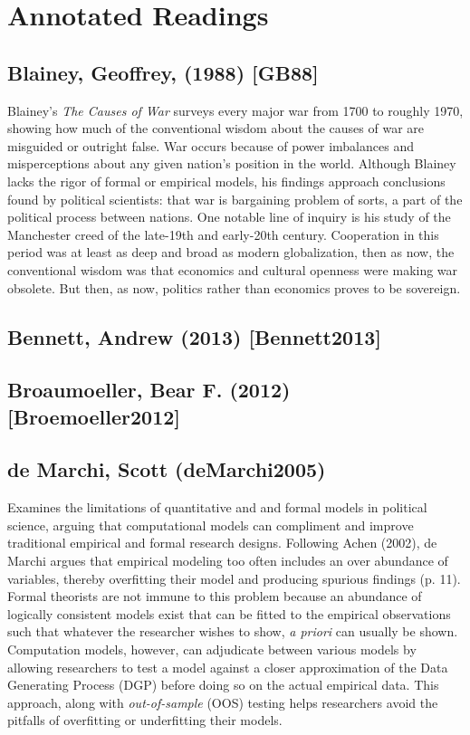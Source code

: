 \documentclass[11pt]{article}
\begin{document}
\section{Annotated Readings}
\label{sec-6}
\subsection{Blainey, Geoffrey, (1988) [GB88]}
\label{sec-6-1}
Blainey's \emph{The Causes of War} surveys every major war from 1700 to
roughly 1970, showing how much of the conventional wisdom about the
causes of war are misguided or outright false. War occurs because of
power imbalances and misperceptions about any given nation's position
in the world. Although Blainey lacks the rigor of formal or empirical
models, his findings approach conclusions found by political
scientists: that war is bargaining problem of sorts, a part of the
political process between nations. One notable line of inquiry is his
study of the Manchester creed of the late-19th and early-20th
century. Cooperation in this period was at least as deep and broad as
modern globalization, then as now, the conventional wisdom was that
economics and cultural openness were making war obsolete. But then, as
now, politics rather than economics proves to be sovereign.  
\subsection{Bennett, Andrew (2013) [Bennett2013]}
\label{sec-6-2}
\subsection{Broaumoeller, Bear F. (2012) [Broemoeller2012]}
\label{sec-6-3}
\subsection{de Marchi, Scott (deMarchi2005)}
\label{sec-6-4}
Examines the limitations of quantitative and and formal models in
political science, arguing that computational models can compliment
and improve traditional empirical and formal research designs.
Following Achen (2002), de Marchi argues that empirical modeling too
often includes an over abundance of variables, thereby overfitting
their model and producing spurious findings (p. 11). Formal theorists
are not immune to this problem because an abundance of logically
consistent models exist that can be fitted to the empirical
observations such that whatever the researcher wishes to show, \emph{a
priori} can usually be shown. Computation models, however, can
adjudicate between various models by allowing researchers to test a
model against a closer approximation of the Data Generating Process
(DGP) before doing so on the actual empirical data. This approach,
along with \emph{out-of-sample} (OOS) testing helps researchers avoid the
pitfalls of overfitting or underfitting their models.   
\end{document}
